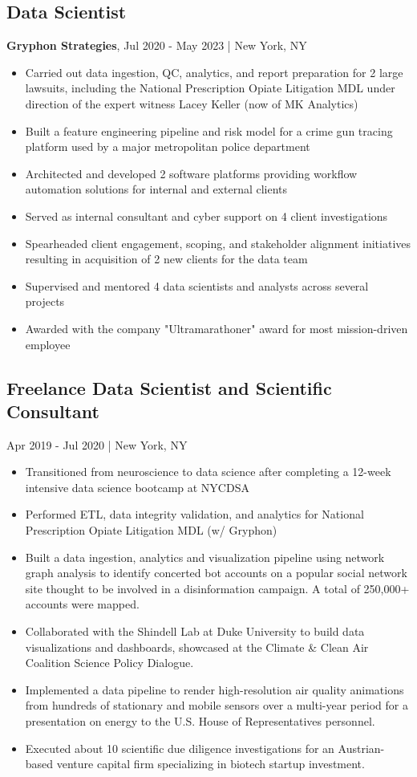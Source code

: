 \documentclass[11pt]{article}
\newenvironment{myitemize}
{ \begin{itemize}
	\setlength{\itemsep}{0pt}
	\setlength{\parskip}{0pt}
	\setlength{\parsep}{0pt}     }
{ \end{itemize}                  }
\begin{document}
\subsection*{Data Scientist}
{\bfseries Gryphon Strategies}, Jul 2020 - May 2023 | New York, NY
\begin{myitemize}
	\item Carried out data ingestion, QC, analytics, and report preparation for 2 large lawsuits, including the National Prescription Opiate Litigation MDL under direction of the expert witness Lacey Keller (now of MK Analytics)
	\item Built a feature engineering pipeline and risk model for a crime gun tracing platform used by a major metropolitan police department
	\item Architected and developed 2 software platforms providing workflow automation solutions for internal and external clients
	\item Served as internal consultant and cyber support on 4 client investigations
	\item Spearheaded client engagement, scoping, and stakeholder alignment initiatives resulting in acquisition of 2 new clients for the data team
	\item Supervised and mentored 4 data scientists and analysts across several projects
	\item Awarded with the company "Ultramarathoner" award for most mission-driven employee
\end{myitemize}

\subsection*{Freelance Data Scientist and Scientific Consultant} Apr 2019 - Jul 2020 | New York, NY
\begin{myitemize}
	\item Transitioned from neuroscience to data science after completing a 12-week intensive data science bootcamp at NYCDSA 
	\item Performed ETL, data integrity validation, and analytics for National Prescription Opiate Litigation MDL (w/ Gryphon)
	\item Built a data ingestion, analytics and visualization pipeline using network graph analysis to identify concerted bot accounts on a popular social network site thought to be involved in a disinformation campaign. A total of 250,000+ accounts were mapped.
	\item Collaborated with the Shindell Lab at Duke University to build data visualizations and dashboards, showcased at the Climate \& Clean Air Coalition Science Policy Dialogue.
	\item Implemented a data pipeline to render high-resolution air quality animations from hundreds of stationary and mobile sensors over a multi-year period for a presentation on energy to the U.S. House of Representatives personnel. 
	\item Executed about 10 scientific due diligence investigations for an Austrian-based venture capital firm specializing in biotech startup investment.
\end{myitemize}
\end{document}
